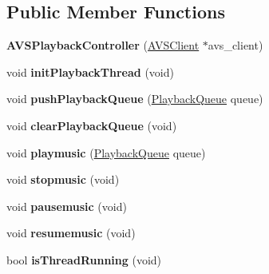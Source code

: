 \subsection*{Public Member Functions}
\begin{DoxyCompactItemize}
\item 
\mbox{\label{classAVSPlaybackController_adb98c7112a30f235cd147fe9ae06ef5d}} 
{\bfseries A\+V\+S\+Playback\+Controller} (\hyperlink{classAVSClient}{A\+V\+S\+Client} $\ast$avs\+\_\+client)
\item 
\mbox{\label{classAVSPlaybackController_aa8558bffc088fe6e432873e2e5b168f1}} 
void {\bfseries init\+Playback\+Thread} (void)
\item 
\mbox{\label{classAVSPlaybackController_a0a26c091f4820d069c4ab1fc2c2d6b09}} 
void {\bfseries push\+Playback\+Queue} (\hyperlink{structPlaybackQueue}{Playback\+Queue} queue)
\item 
\mbox{\label{classAVSPlaybackController_a467b40ea41b996f257264aa949dbfd7b}} 
void {\bfseries clear\+Playback\+Queue} (void)
\item 
\mbox{\label{classAVSPlaybackController_acea50cfab83625c4b7b72b7259ebc789}} 
void {\bfseries playmusic} (\hyperlink{structPlaybackQueue}{Playback\+Queue} queue)
\item 
\mbox{\label{classAVSPlaybackController_aac5268872ae90e80ea0c053c412f7f9d}} 
void {\bfseries stopmusic} (void)
\item 
\mbox{\label{classAVSPlaybackController_a2a4e4baed803290dc861ee9814f0d61b}} 
void {\bfseries pausemusic} (void)
\item 
\mbox{\label{classAVSPlaybackController_a4c35f58551f460513812589b8baa0b78}} 
void {\bfseries resumemusic} (void)
\item 
\mbox{\label{classAVSPlaybackController_ab7033fe2d23261d7fb00afde067543ab}} 
bool {\bfseries is\+Thread\+Running} (void)
\item 

\end{DoxyCompactItemize}
